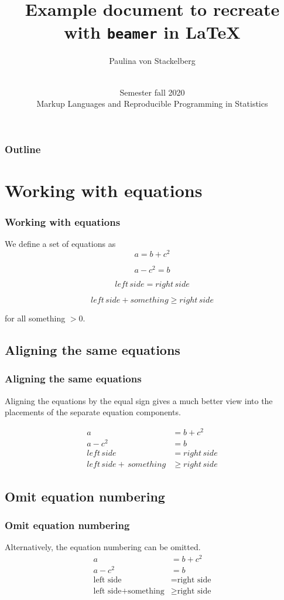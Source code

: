 \documentclass[aspectratio=169]{beamer} %
\title[Example] {Example document to recreate with \texttt{beamer} in \LaTeX}
\author[Your Name]
{
 Paulina von Stackelberg
}
\date[MLRPS]
{\vspace{.5 in}\\ Semester fall 2020 \\ Markup Languages and Reproducible Programming in Statistics  \vskip6mm}
\begin{document}
\titlepage

\begin{frame}
\frametitle{Outline}
\tableofcontents
\end{frame}


\section{Working with equations}
\begin{frame}
\frametitle{Working with equations}
    We define a set of equations as
\begin{equation}
    a=b+c^2
\end{equation}

\begin{equation}
    a-c^2=b
\end{equation}
    
\begin{equation}
    left \, side = right \,side
\end{equation}

\begin{equation}
    left \, side  + something \geq right \, side
\end{equation}

for all something $ > 0$. 
\end{frame}


\subsection{Aligning the same equations}
\begin{frame}

\frametitle{Aligning the same equations}

Aligning the equations by the equal sign gives a much better view into the placements of the separate equation components. 


\begin{align}
    a&=b+c^2\\
    a-c^2&=b\\
    left \, side &= right \, side\\
    left \, side + \, something & \geq right \,side
\end{align}
\end{frame}





\subsection{Omit equation numbering}
\begin{frame}
\frametitle{Omit equation numbering}
    Alternatively, the equation numbering can be omitted. 
    \begin{align*}
    	a&=b+c^2\\
    	a-c^2&=b\\
    	\text{left side} &= \text{right side}\\
    	\text{left side} + \text{something} & \geq \text{right side}
    \end{align*}
\end{frame}
\end{document}
